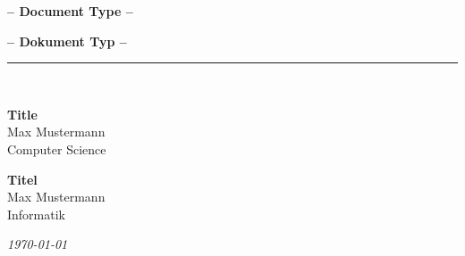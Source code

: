 %
\vspace{2.0cm}
%
\begin{center}
\begin{en}
    \Large{\textbf{--  Document Type --}}
\end{en}
\begin{de}
    \Large{\textbf{--  Dokument Typ --}}
\end{de}
    \rule{\textwidth}{0.6pt}\\[0.5cm]
\begin{en}
    \Large{\textbf{Title}}\\[3.0cm]
    \Large{Max Mustermann}\\
    \Large{Computer Science}\\
\end{en}
\begin{de}
    \Large{\textbf{Titel}}\\[3.0cm]
    \Large{Max Mustermann}\\
    \Large{Informatik}\\
\end{de}
\end{center}
%
\begin{center}
	 \large{\textit{\today}}
\end{center}
%
\vfill
\begin{center}
	\large
\begin{en}
        \\[0.2em]
        \\[0.2em]
\end{en}
\begin{de}
        \\[0.2em]
        \\[0.2em]
        \\[0.2em]
\end{de}
	\normalsize
\end{center}
%
